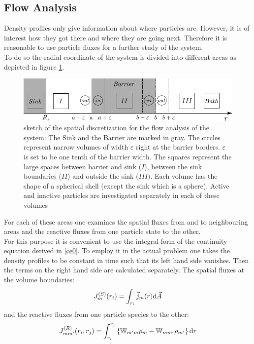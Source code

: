 \newpage
\subsection{Flow Analysis}
Density profiles only give information about where particles are. However, it is of interest how they got there and where they are going next. Therefore it is reasonable to use particle fluxes for a further study of the system. \\
To do so the radial coordinate of the system is divided into different areas as depicted in figure \ref{fig:flowchart_scetch}.
\begin{figure}[H]
    \centering
    \includegraphics[width = .9 \textwidth]{plots/drawing.pdf}
    \caption{sketch of the spatial discretization for the flow analysis of the system: The Sink and the Barrier are marked in gray. The circles represent narrow volumes of width $\varepsilon$ right at the barrier borders. $\varepsilon$ is set to be one tenth of the barrier width. The squares represent the large spaces between barrier and sink ($I$), between the sink boundaries ($II$) and outside the sink ($III)$. Each volume has the shape of a spherical shell (except the sink which is a sphere). Active and inactive particles are investigated separately in each of these volumes}
    \label{fig:flowchart_scetch}
\end{figure}
For each of these areas one examines the spatial fluxes from and to neighbouring areas and the reactive fluxes from one particle state to the other. \\
For this purpose it is convenient to use the integral form of the continuity equation derived in \eqref{ce0}. To employ it in the actual problem one takes the density profiles to be constant in time such that its left hand side vanishes. Then the terms on the right hand side are calculated separately. The spatial fluxes at the volume boundaries:
\begin{equation}
    J_m^{(S)}(r_i) = \int_{r_i} \vec{j}_m(r) {\rm d} \vec{A}
    \label{spatial_flux}
\end{equation}
and the reactive fluxes from one particle species to the other:
\begin{equation}
    J_{mm'}^{(R)}(r_i,r_j) =\int_{r_i}^{r_j} \left\{ \mathbb{W}_{m'm}\rho_m - \mathbb{W}_{mm'} \rho_{m'} \right\} {\rm d} r
    \label{reaction_flux}
\end{equation}
